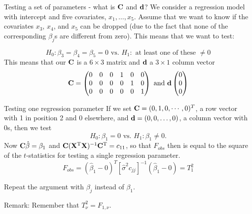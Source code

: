 \documentclass[
  ignorenonframetext,
]{beamer}
\begin{document}
\begin{frame}{Testing a set of parameters - what is \({\bf C}\) and
\({\bf d}\)?}
\label{testing-a-set-of-parameters---what-is-bf-c-and-bf-d}
We consider a regression model with intercept and five covariates,
\(x_1, \ldots, x_5\). Assume that we want to know if the covariates
\(x_3\), \(x_4\), and \(x_5\) can be dropped (due to the fact that none
of the corresponding \(\beta_j\)s are different from zero). This means
that we want to test:

\[H_0: \beta_{3}=\beta_{4}=\beta_{5}=0 \text{ vs. } H_1:\text{ at least one of these }\neq 0\]
This means that our \({\bf C}\) is a \(6\times 3\) matrix and
\({\bf d}\) a \(3 \times 1\) column vector
\[ {\bf C}=\begin{pmatrix} 0 &0 &0 &1 &0&0 \\
0&0&0&0&1&0\\
0&0&0&0&0& 1\\
\end{pmatrix} \text{ and } 
{\bf d} \begin{pmatrix} 0\\0\\0\\ \end{pmatrix}\]
\end{frame}

\begin{frame}{Testing one regression parameter}
\label{testing-one-regression-parameter}
If we set \({\bf C}=(0,1, 0, \cdots, 0)^T\), a row vector with 1 in
position 2 and 0 elsewhere, and \({\bf d}=(0,0,\ldots,0)\), a column
vector with 0s, then we test
\[ H_0: \beta_1=0 \text{ vs. } H_1: \beta_1\neq 0.\] Now
\({\bf C}\hat{\beta}=\beta_1\) and
\({\bf C}({\bf X}^{\text T}{\bf X})^{-1}{\bf C}^{\text T}=c_{11}\), so
that \(F_{obs}\) then is equal to the square of the \(t\)-statistics for
testing a single regression parameter.
\[F_{obs}=(\hat{\beta}_1-0)^T[\hat{\sigma}^2 c_{jj}]^{-1}(\hat{\beta}_1-0)=T_1^2\]

Repeat the argument with \(\beta_j\) instead of \(\beta_1\).

Remark: Remember that \(T_{\nu}^2=F_{1,\nu}\).
\end{frame}
\end{document}
